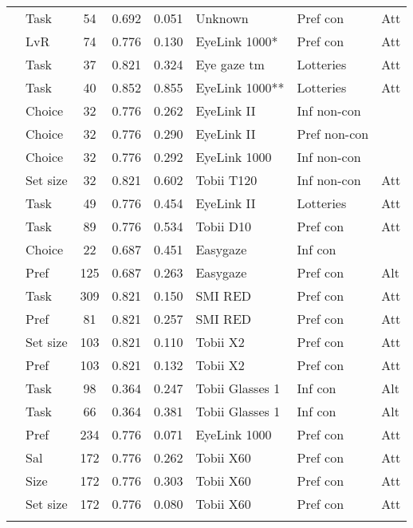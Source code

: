 \begin{longtable}{p{5cm}lccclll}
  \cite{pieters1999} & Task & 54 & 0.692 & 0.051 & Unknown & Pref con & Att \\ 
  \cite{robertson2020} & LvR & 74 & 0.776 & 0.130 & EyeLink 1000* & Pref con & Att \\ 
  \cite{rubaltelli2012} & Task & 37 & 0.821 & 0.324 & Eye gaze tm & Lotteries & Att \\ 
  \cite{schoemann2019} & Task & 40 & 0.852 & 0.855 & EyeLink 1000** & Lotteries & Att \\ 
  \cite{schotter2010a} & Choice & 32 & 0.776 & 0.262 & EyeLink II & Inf non-con &  \\ 
  \cite{schotter2010a} & Choice & 32 & 0.776 & 0.290 & EyeLink II & Pref non-con &  \\ 
  \cite{schotter2012a} & Choice & 32 & 0.776 & 0.292 & EyeLink 1000 & Inf non-con &  \\ 
  \cite{spinks2016a} & Set size & 32 & 0.821 & 0.602 & Tobii T120 & Inf non-con & Att \\ 
  \cite{su2013} & Task & 49 & 0.776 & 0.454 & EyeLink II & Lotteries & Att \\ 
  \cite{turner2014} & Task & 89 & 0.776 & 0.534 & Tobii D10 & Pref con & Att \\ 
  \cite{vanderlaan2015} & Choice & 22 & 0.687 & 0.451 & Easygaze & Inf con &  \\ 
  \cite{vanderlaan2017} & Pref & 125 & 0.687 & 0.263 & Easygaze & Pref con & Alt \\ 
  \cite{vanherpen2011} & Task & 309 & 0.821 & 0.150 & SMI RED & Pref con & Att \\ 
  \cite{vanloo2015} & Pref & 81 & 0.821 & 0.257 & SMI RED & Pref con & Att \\ 
  \cite{vanloo2019} & Set size & 103 & 0.821 & 0.110 & Tobii X2 & Pref con & Att \\ 
  \cite{vanloo2019} & Pref & 103 & 0.821 & 0.132 & Tobii X2 & Pref con & Att \\ 
  \cite{wastlund2015} & Task & 98 & 0.364 & 0.247 & Tobii Glasses 1 & Inf con & Alt \\ 
  \cite{wastlund2015} & Task & 66 & 0.364 & 0.381 & Tobii Glasses 1 & Inf con & Alt \\ 
  \cite{wolfson2017} & Pref & 234 & 0.776 & 0.071 & EyeLink 1000 & Pref con & Att \\ 
  \cite{zuschke2020} & Sal & 172 & 0.776 & 0.262 & Tobii X60 & Pref con & Att \\ 
  \cite{zuschke2020} & Size & 172 & 0.776 & 0.303 & Tobii X60 & Pref con & Att \\ 
  \cite{zuschke2020} & Set size & 172 & 0.776 & 0.080 & Tobii X60 & Pref con & Att \\ 
  \hline
\label{tab:overviewtable}
\end{longtable}
\endgroup
